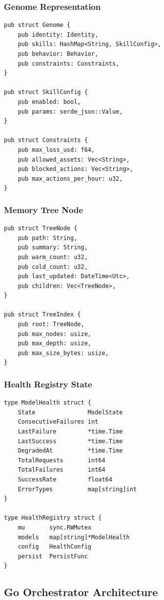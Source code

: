\documentclass[conference]{IEEEtran}
\begin{document}
\subsubsection{Genome Representation}

\begin{lstlisting}[style=rustcode]
pub struct Genome {
    pub identity: Identity,
    pub skills: HashMap<String, SkillConfig>,
    pub behavior: Behavior,
    pub constraints: Constraints,
}

pub struct SkillConfig {
    pub enabled: bool,
    pub params: serde_json::Value,
}

pub struct Constraints {
    pub max_loss_usd: f64,
    pub allowed_assets: Vec<String>,
    pub blocked_actions: Vec<String>,
    pub max_actions_per_hour: u32,
}
\end{lstlisting}

\subsubsection{Memory Tree Node}

\begin{lstlisting}[style=rustcode]
pub struct TreeNode {
    pub path: String,
    pub summary: String,
    pub warm_count: u32,
    pub cold_count: u32,
    pub last_updated: DateTime<Utc>,
    pub children: Vec<TreeNode>,
}

pub struct TreeIndex {
    pub root: TreeNode,
    pub max_nodes: usize,
    pub max_depth: usize,
    pub max_size_bytes: usize,
}
\end{lstlisting}

\subsubsection{Health Registry State}

\begin{lstlisting}[style=gocode]
type ModelHealth struct {
    State               ModelState
    ConsecutiveFailures int
    LastFailure         *time.Time
    LastSuccess         *time.Time
    DegradedAt          *time.Time
    TotalRequests       int64
    TotalFailures       int64
    SuccessRate         float64
    ErrorTypes          map[string]int
}

type HealthRegistry struct {
    mu       sync.RWMutex
    models   map[string]*ModelHealth
    config   HealthConfig
    persist  PersistFunc
}
\end{lstlisting}

\subsection{Go Orchestrator Architecture}
\end{document}
